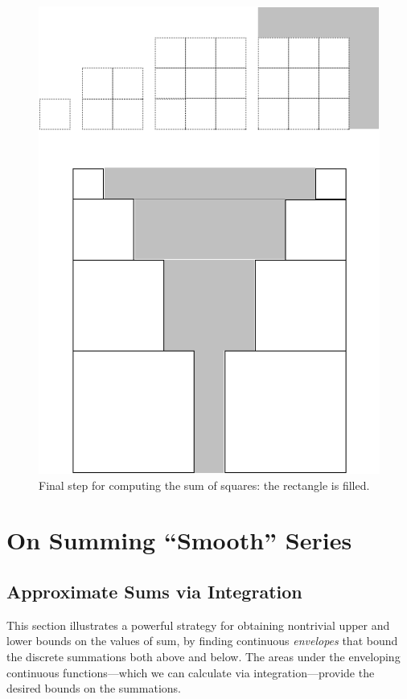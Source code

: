 \begin{figure}[ht]
\begin{center}
       \includegraphics[scale=0.4]{FiguresMaths/SumSquares5}
\caption{Final step for computing the sum of squares: the rectangle is filled.}
       \label{fig:sumSquares5}
\end{center}
\end{figure}


\section{On Summing ``Smooth'' Series}
\label{sec:smooth-series}

\subsection{Approximate Sums via Integration}
\label{sec:riemann-bounds}

This section illustrates a powerful strategy for obtaining nontrivial
upper and lower bounds on the values of sum, by finding continuous {\em
  envelopes} that bound the discrete summations both above and below.
The areas under the enveloping continuous functions---which we can
calculate via integration---provide the desired bounds on the
summations.

